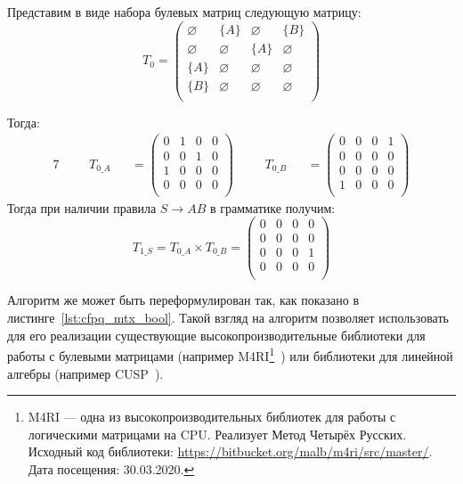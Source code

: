 \begin{example}
Представим в виде набора булевых матриц следующую матрицу:
\[
T_0 = \begin{pmatrix}
\varnothing & \{A\}       & \varnothing & \{B\}       \\
\varnothing & \varnothing & \{A\}       & \varnothing \\
\{A\}       & \varnothing & \varnothing & \varnothing \\
\{B\}       & \varnothing & \varnothing & \varnothing \\
\end{pmatrix}
\]

Тогда:
\begin{alignat*}{7}
& &&T_{0\_A} &&= \begin{pmatrix}
0 & 1       & 0 & 0       \\
0 & 0 & 1       & 0 \\
1  & 0 & 0 & 0       \\
0       & 0 & 0 & 0 \\
\end{pmatrix} \ \ \ \ &&T_{0\_B} &&= \begin{pmatrix}
0 & 0       & 0 & 1       \\
0       & 0 & 0       & 0 \\
0  & 0 & 0 & 0       \\
1       & 0 & 0 & 0 \\
\end{pmatrix}
\end{alignat*}
Тогда при наличии правила $S \to A B$ в грамматике получим:
\[
T_{1\_S} =T_{0\_A} \times T_{0\_B} = \begin{pmatrix}
0 & 0       & 0 & 0       \\
0       & 0 & 0       & 0 \\
0  & 0 & 0 & 1       \\
0       & 0 & 0 & 0 \\
\end{pmatrix}
\]
\end{example}

Алгоритм же может быть переформулирован так, как показано в листинге~\ref{lst:cfpq_mtx_bool}.
Такой взгляд на алгоритм позволяет использовать для его реализации существующие высокопроизводительные библиотеки для работы с булевыми матрицами (например M4RI\footnote{M4RI --- одна из высокопроизводительных библиотек для работы с логическими матрицами на CPU. Реализует Метод Четырёх Русских. Исходный код библиотеки: \url{https://bitbucket.org/malb/m4ri/src/master/}. Дата посещения: 30.03.2020.}~\cite{DBLP:journals/corr/abs-0811-1714}) или библиотеки для линейной алгебры (например CUSP~\cite{Cusp}).

